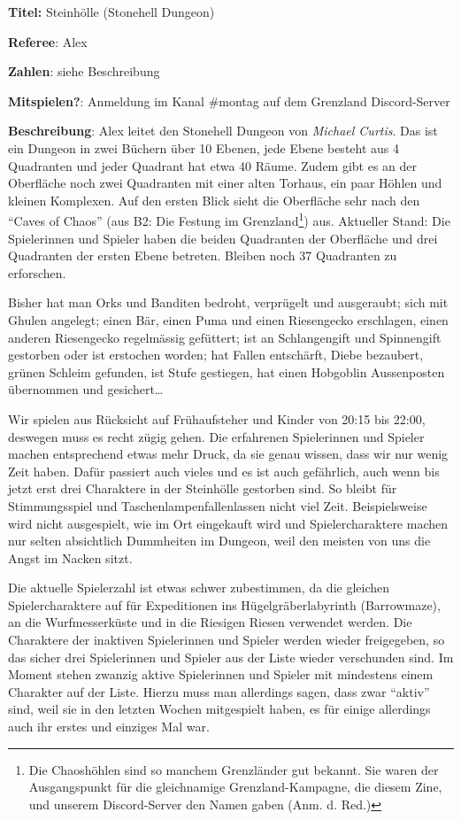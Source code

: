\documentclass[11pt]{wbzine}
\begin{document}
\begin{multicols}{2}
    \textbf{Titel:} Steinhölle (Stonehell Dungeon) 
	
    \textbf{Referee}: Alex
    
    \textbf{Zahlen}: siehe Beschreibung

    \textbf{Mitspielen?}: Anmeldung im Kanal \#montag auf dem Grenzland
	Discord-Server

    \textbf{Beschreibung}: Alex leitet den Stonehell Dungeon von
	\textit{Michael Curtis}. Das ist ein Dungeon in zwei Büchern über 10
	Ebenen, jede Ebene besteht aus 4 Quadranten und jeder
	Quadrant hat etwa 40 Räume. Zudem gibt es an der Oberfläche
	noch zwei Quadranten mit einer alten Torhaus, ein paar
	Höhlen und kleinen Komplexen. Auf den ersten Blick sieht die
	Oberfläche sehr nach den “Caves of Chaos” (aus B2: Die Festung im
	Grenzland\footnote{Die Chaoshöhlen sind so manchem
	Grenzländer gut bekannt. Sie waren der Ausgangspunkt für die
	gleichnamige Grenzland-Kampagne, die diesem Zine, und
	unserem Discord-Server den Namen gaben (Anm. d. Red.)}) aus.
	Aktueller Stand: Die Spielerinnen und Spieler haben die
	beiden Quadranten der Oberfläche und drei Quadranten der
	ersten Ebene betreten. Bleiben noch 37 Quadranten zu
	erforschen.

	Bisher hat man Orks und Banditen bedroht, verprügelt und
	ausgeraubt; sich mit Ghulen angelegt; einen Bär, einen Puma
	und einen Riesengecko erschlagen, einen anderen Riesengecko
	regelmässig gefüttert; ist an Schlangengift und Spinnengift
	gestorben oder ist erstochen worden; hat Fallen entschärft,
	Diebe bezaubert, grünen Schleim gefunden, ist Stufe
	gestiegen, hat einen Hobgoblin Aussenposten übernommen und
	gesichert…

	Wir spielen aus Rücksicht auf Frühaufsteher und Kinder von
	20:15 bis 22:00, deswegen muss es recht zügig gehen. Die
	erfahrenen Spielerinnen und Spieler machen entsprechend
	etwas mehr Druck, da sie genau wissen, dass wir nur wenig
	Zeit haben. Dafür passiert auch vieles und es ist auch
	gefährlich, auch wenn bis jetzt erst drei Charaktere in der
	Steinhölle gestorben sind. So bleibt für Stimmungsspiel und
	Taschenlampenfallenlassen nicht viel Zeit. Beispielsweise
	wird nicht ausgespielt, wie im Ort eingekauft wird und
	Spielercharaktere machen nur selten absichtlich Dummheiten
	im Dungeon, weil den meisten von uns die Angst im Nacken
	sitzt.

	Die aktuelle Spielerzahl ist etwas schwer zubestimmen, da
	die gleichen Spielercharaktere auf für Expeditionen ins
	Hügelgräberlabyrinth (Barrowmaze), an die Wurfmesserküste
	und in die Riesigen Riesen verwendet werden. Die Charaktere
	der inaktiven Spielerinnen und Spieler werden wieder
	freigegeben, so das sicher drei Spielerinnen und Spieler aus
	der Liste wieder verschunden sind. Im Moment stehen zwanzig
	aktive Spielerinnen und Spieler mit mindestens einem
	Charakter auf der Liste. Hierzu muss man allerdings sagen,
	dass zwar “aktiv” sind, weil sie in den letzten Wochen
	mitgespielt haben, es für einige allerdings auch ihr erstes
	und einziges Mal war.


\end{multicols}
\end{document}
